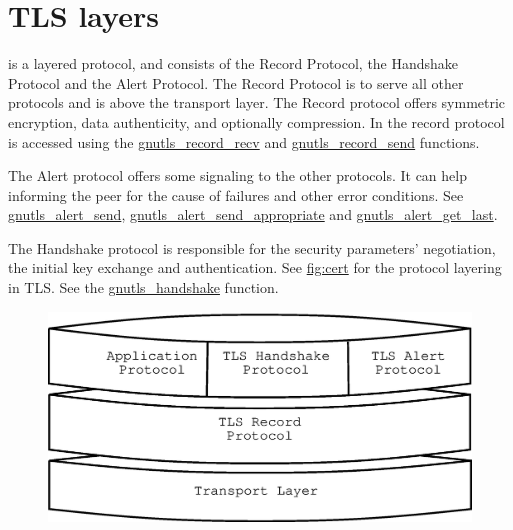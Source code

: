 \newpage
\section{TLS layers}

\tlsI{} is a layered protocol, and consists of the Record Protocol,
the Handshake Protocol and the Alert Protocol. The Record Protocol
is to serve all other protocols and is above the transport layer.
The Record protocol offers symmetric encryption, data authenticity, and
optionally compression.
In \gnutls{} the record protocol is accessed using the 
\hyperref{gnutls\_record\_recv()}{gnutls\_record\_recv() (see Section }{)}{gnutls_record_recv} and
\hyperref{gnutls\_record\_send()}{gnutls\_record\_send() (see Section }{)}{gnutls_record_send}
functions.

\par
The Alert protocol offers some signaling to the other protocols. It can
help informing the peer for the cause of failures and other error
conditions. See
\hyperref{gnutls\_alert\_send()}{gnutls\_alert\_send() (see Section }{)}{gnutls_alert_send},
\hyperref{gnutls\_alert\_send\_appropriate()}{gnutls\_alert\_send\_appropriate() (see Section }{)}{gnutls_alert_send_appropriate}
and
\hyperref{gnutls\_alert\_get\_last()}{gnutls\_alert\_get\_last() (see Section }{)}{gnutls_alert_get_last}.

\par 
The Handshake protocol is responsible for the security parameters'
negotiation, the initial key exchange and
authentication. See \hyperref{figure}{figure }{}{fig:cert} for the
protocol layering in TLS. See the
\hyperref{gnutls\_handshake()}{gnutls\_handshake() (see Section }{)}{gnutls_handshake} function.

\begin{figure}[hbtp]
\includegraphics{layers}
\label{fig:layers}

\end{figure}


\addvspace{1.5cm}

